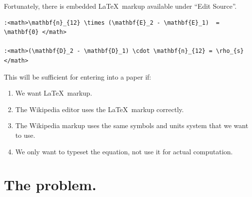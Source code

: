 \documentclass[12pt,letterpaper]{article}
\begin{document}
Fortunately,
there is embedded \LaTeX\ markup available under ``Edit Source''.

\begin{verbatim}
:<math>\mathbf{n}_{12} \times (\mathbf{E}_2 - \mathbf{E}_1)  = \mathbf{0} </math>

:<math>(\mathbf{D}_2 - \mathbf{D}_1) \cdot \mathbf{n}_{12} = \rho_{s} </math>
\end{verbatim}

This will be sufficient for entering into a paper if:
\begin{enumerate}
\item We want \LaTeX\ markup.
\item The Wikipedia editor uses the \LaTeX\ markup correctly.
\item The Wikipedia markup uses the same symbols and units system that we want to use.
\item We only want to typeset the equation, not use it for actual computation.
\end{enumerate}

\section{The problem.}
\end{document}
